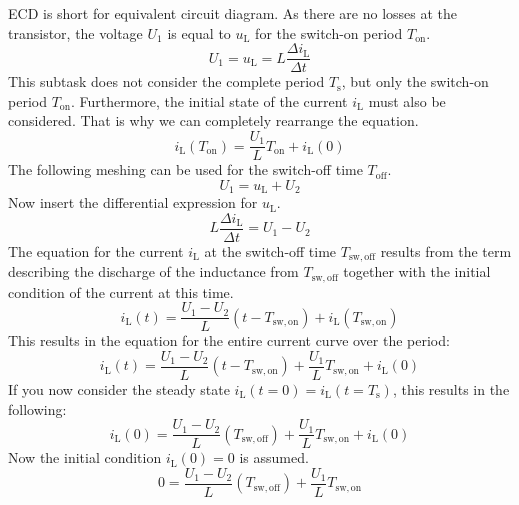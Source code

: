 \begin{solutionblock}
    
    ECD is short for equivalent circuit diagram.
    As there are no losses at the transistor, the voltage $U_{\mathrm{1}}$ is equal to $u_{\mathrm{L}}$ for the switch-on period $T_{\mathrm{on}}$.
    \begin{equation}
        U_{\mathrm{1}} = u_{\mathrm{L}} = L \frac{\Delta i_{\mathrm{L}} }{\Delta t} 
    \end{equation}
    This subtask does not consider the complete period $T_{\mathrm{s}}$, but only the switch-on period $T_{\mathrm{on}}$. Furthermore, the initial state of the current $i_{\mathrm{L}}$ must also be considered.
    That is why we can completely rearrange the equation.
    \begin{equation}
        i_{\mathrm{L}}(T_{\mathrm{on}}) =  \frac{U_{\mathrm{1}} }{L}T_{\mathrm{on}} +  i_{\mathrm{L}}(0)
    \end{equation}
    The following meshing can be used for the switch-off time $T_{\mathrm{off}}$.
    \begin{equation}
        U_{\mathrm{1}} = u_{\mathrm{L}} + U_{\mathrm{2}}
    \end{equation}
    Now insert the differential expression for $u_{\mathrm{L}}$. 
    \begin{equation}
        L \frac{\Delta i_{\mathrm{L}} }{\Delta t} = U_{\mathrm{1}} - U_{\mathrm{2}}
    \end{equation}
    The equation for the current $i_{\mathrm{L}}$ at the switch-off time $T_{\mathrm{sw,off}}$ results from the term describing the discharge of the inductance from $T_{\mathrm{sw,off}}$ together with the initial condition of the current at this time.
    \begin{equation}
        i_{\mathrm{L}}(t) = \frac{U_{\mathrm{1}}-U_{\mathrm{2}} }{L} (t-T_{\mathrm{sw,on}})+i_{\mathrm{L}}(T_{\mathrm{sw,on}})
    \end{equation}
    This results in the equation for the entire current curve over the period: 
    \begin{equation}
        i_{\mathrm{L}}(t) = \frac{U_{\mathrm{1}}-U_{\mathrm{2}} }{L} (t-T_{\mathrm{sw,on}})+\frac{U_{\mathrm{1}}}{L}T_{\mathrm{sw,on}}+i_{\mathrm{L}}(0)
    \end{equation}
    If you now consider the steady state $i_{\mathrm{L}}(t=0)=i_{\mathrm{L}}(t=T_{\mathrm{s}})$, this results in the following:
    \begin{equation}
        i_{\mathrm{L}}(0) = \frac{U_{\mathrm{1}}-U_{\mathrm{2}} }{L} (T_{\mathrm{sw,off}})+\frac{U_{\mathrm{1}}}{L}T_{\mathrm{sw,on}}+i_{\mathrm{L}}(0)
    \end{equation}
    Now the initial condition $i_{\mathrm{L}}(0)=0$ is assumed.
    \begin{equation}
        0 = \frac{U_{\mathrm{1}}-U_{\mathrm{2}} }{L} (T_{\mathrm{sw,off}})+\frac{U_{\mathrm{1}}}{L}T_{\mathrm{sw,on}}
    \end{equation}


\end{solutionblock}
